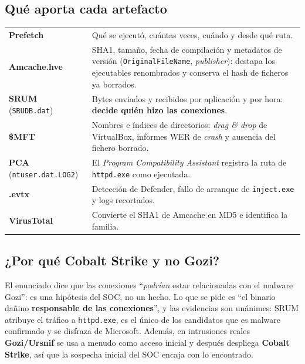 \documentclass[11pt,a4paper]{article}
\begin{document}
\subsection{Qué aporta cada artefacto}
\begin{tabularx}{\linewidth}{@{}lX@{}}
\toprule
\textbf{Prefetch} & Qué se ejecutó, cuántas veces, cuándo y desde qué ruta. \\
\textbf{Amcache.hve} & SHA1, tamaño, fecha de compilación y metadatos de versión (\texttt{OriginalFileName}, \emph{publisher}):
  destapa los ejecutables renombrados y conserva el hash de ficheros ya borrados. \\
\textbf{SRUM} (\texttt{SRUDB.dat}) & Bytes enviados y recibidos por aplicación y por hora: \textbf{decide quién hizo las conexiones}. \\
\textbf{\$MFT} & Nombres e índices de directorios: \emph{drag \& drop} de VirtualBox, informes WER de \emph{crash} y
  ausencia del fichero borrado. \\
\textbf{PCA} (\texttt{ntuser.dat.LOG2}) & El \emph{Program Compatibility Assistant} registra la ruta de \texttt{httpd.exe} como ejecutada. \\
\textbf{.evtx} & Detección de Defender, fallo de arranque de \texttt{inject.exe} y logs recortados. \\
\textbf{VirusTotal} & Convierte el SHA1 de Amcache en MD5 e identifica la familia. \\
\bottomrule
\end{tabularx}

\subsection{¿Por qué Cobalt Strike y no Gozi?}
El enunciado dice que las conexiones ``\emph{podrían} estar relacionadas con el malware Gozi'': es una hipótesis del
SOC, no un hecho. Lo que se pide es ``el binario dañino \textbf{responsable de las conexiones}'', y las evidencias son
unánimes: SRUM atribuye el tráfico a \texttt{httpd.exe}, es el único de los candidatos que es malware confirmado y se
disfraza de Microsoft. Además, en intrusiones reales \textbf{Gozi/Ursnif} se usa a menudo como acceso inicial y después
despliega \textbf{Cobalt Strike}, así que la sospecha inicial del SOC encaja con lo encontrado.
\end{document}
